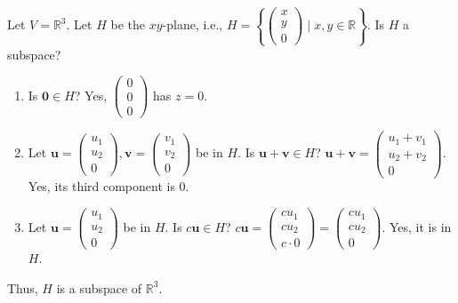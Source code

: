 \begin{example}[A subspace]
Let $V = \mathbb{R}^3$. Let $H$ be the $xy$-plane, i.e., $H = \left\{ \begin{pmatrix} x \\ y \\ 0 \end{pmatrix} \mid x, y \in \mathbb{R} \right\}$.
Is $H$ a subspace?
\begin{enumerate}
    \item Is $\mathbf{0} \in H$? Yes, $\begin{pmatrix} 0 \\ 0 \\ 0 \end{pmatrix}$ has $z=0$.
    \item Let $\mathbf{u} = \begin{pmatrix} u_1 \\ u_2 \\ 0 \end{pmatrix}, \mathbf{v} = \begin{pmatrix} v_1 \\ v_2 \\ 0 \end{pmatrix}$ be in $H$.
    Is $\mathbf{u} + \mathbf{v} \in H$? $\mathbf{u} + \mathbf{v} = \begin{pmatrix} u_1+v_1 \\ u_2+v_2 \\ 0 \end{pmatrix}$. Yes, its third component is 0.
    \item Let $\mathbf{u} = \begin{pmatrix} u_1 \\ u_2 \\ 0 \end{pmatrix}$ be in $H$. Is $c\mathbf{u} \in H$?
    $c\mathbf{u} = \begin{pmatrix} cu_1 \\ cu_2 \\ c \cdot 0 \end{pmatrix} = \begin{pmatrix} cu_1 \\ cu_2 \\ 0 \end{pmatrix}$. Yes, it is in $H$.
\end{enumerate}
Thus, $H$ is a subspace of $\mathbb{R}^3$.
\end{example}

